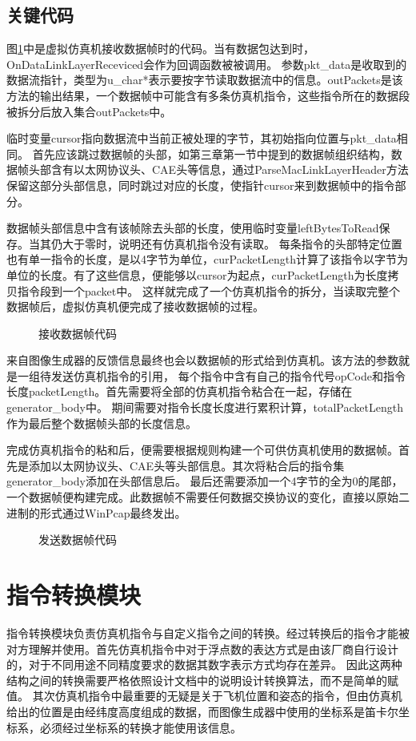 \subsection{关键代码}
图\ref{codeSimRec}中是虚拟仿真机接收数据帧时的代码。当有数据包达到时，OnDataLinkLayerReceviced会作为回调函数被被调用。
参数pkt\_data是收取到的数据流指针，类型为u\_char*表示要按字节读取数据流中的信息。outPackets是该方法的输出结果，一个数据帧中可能含有多条仿真机指令，这些指令所在的数据段被拆分后放入集合outPackets中。
\par
临时变量cursor指向数据流中当前正被处理的字节，其初始指向位置与pkt\_data相同。
首先应该跳过数据帧的头部，如第三章第一节中提到的数据帧组织结构，数据帧头部含有以太网协议头、CAE头等信息，通过ParseMacLinkLayerHeader方法保留这部分头部信息，同时跳过对应的长度，使指针cursor来到数据帧中的指令部分。
\par
数据帧头部信息中含有该帧除去头部的长度，使用临时变量leftBytesToRead保存。当其仍大于零时，说明还有仿真机指令没有读取。
每条指令的头部特定位置也有单一指令的长度，是以4字节为单位，curPacketLength计算了该指令以字节为单位的长度。有了这些信息，便能够以cursor为起点，curPacketLength为长度拷贝指令段到一个packet中。
这样就完成了一个仿真机指令的拆分，当读取完整个数据帧后，虚拟仿真机便完成了接收数据帧的过程。
\begin{figure}[h!]
    \centering
     
    \caption{接收数据帧代码}
    \label{codeSimRec}
\end{figure}
\par
来自图像生成器的反馈信息最终也会以数据帧的形式给到仿真机。该方法的参数就是一组待发送仿真机指令的引用，
每个指令中含有自己的指令代号opCode和指令长度packetLength。首先需要将全部的仿真机指令粘合在一起，存储在generator\_body中。
期间需要对指令长度长度进行累积计算，totalPacketLength作为最后整个数据帧头部的长度信息。
\clearpage
\par
完成仿真机指令的粘和后，便需要根据规则构建一个可供仿真机使用的数据帧。首先是添加以太网协议头、CAE头等头部信息。其次将粘合后的指令集generator\_body添加在头部信息后。
最后还需要添加一个4字节的全为0的尾部，一个数据帧便构建完成。此数据帧不需要任何数据交换协议的变化，直接以原始二进制的形式通过WinPcap最终发出。
\begin{figure}[h!]
    \centering
     
    \caption{发送数据帧代码}
    \label{codeSimSend}
\end{figure}

\section{指令转换模块}
指令转换模块负责仿真机指令与自定义指令之间的转换。经过转换后的指令才能被对方理解并使用。首先仿真机指令中对于浮点数的表达方式是由该厂商自行设计的，对于不同用途不同精度要求的数据其数字表示方式均存在差异。
因此这两种结构之间的转换需要严格依照设计文档中的说明设计转换算法，而不是简单的赋值。
其次仿真机指令中最重要的无疑是关于飞机位置和姿态的指令，但由仿真机给出的位置是由经纬度高度组成的数据，而图像生成器中使用的坐标系是笛卡尔坐标系，必须经过坐标系的转换才能使用该信息。
